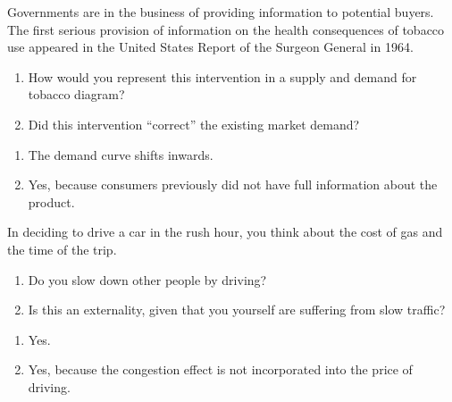 \begin{enumialphparenastyle}
\begin{ex}\label{ex:ch5ex5}
Governments are in the business of providing information to potential buyers. The first serious provision of information on the health consequences of tobacco use appeared in the United States Report of the Surgeon General in 1964.
\begin{enumerate}
	\item	How would you represent this intervention in a supply and demand for tobacco diagram?
	\item	Did this intervention ``correct'' the existing market demand?
\end{enumerate}
\begin{sol}
\begin{enumerate}
	\item	The demand curve shifts inwards.
	\item	Yes, because consumers previously did not have full information about the product.
\end{enumerate}
\end{sol}
\end{ex}

\begin{ex}\label{ex:ch5ex6}
In deciding to drive a car in the rush hour, you think about the cost of gas and the time of the trip.
\begin{enumerate}
	\item	Do you slow down other people by driving?
	\item	Is this an externality, given that you yourself are suffering from slow traffic?
\end{enumerate}
\begin{sol}
\begin{enumerate}
	\item	Yes.
	\item	Yes, because the congestion effect is not incorporated into the price of driving.
\end{enumerate}
\end{sol}
\end{ex}


\end{enumialphparenastyle}
